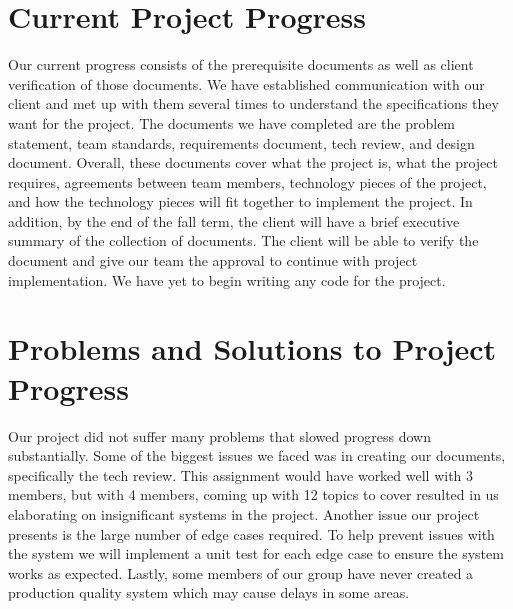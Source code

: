 \documentclass[letterpaper,10pt,draftclsnofoot,onecolumn,]{article}
\begin{document}
\section{Current Project Progress}
Our current progress consists of the prerequisite documents as well as client verification of those documents. We have established communication with our client and met up with them several times to understand the specifications they want for the project. The documents we have completed are the problem statement, team standards, requirements document, tech review, and design document. Overall, these documents cover what the project is, what the project requires, agreements between team members, technology pieces of the project, and how the technology pieces will fit together to implement the project. In addition, by the end of the fall term, the client will have a brief executive summary of the collection of documents. The client will be able to verify the document and give our team the approval to continue with project implementation. We have yet to begin writing any code for the project. 


\section{Problems and Solutions to Project Progress}
Our project did not suffer many problems that slowed progress down substantially. Some of the biggest issues we faced was in creating our documents, specifically the tech review. This assignment would have worked well with 3 members, but with 4 members, coming up with 12 topics to cover resulted in us elaborating on insignificant systems in the project. Another issue our project presents is the large number of edge cases required. To help prevent issues with the system we will implement a unit test for each edge case to ensure the system works as expected. Lastly, some members of our group have never created a production quality system which may cause delays in some areas. 
\end{document}
